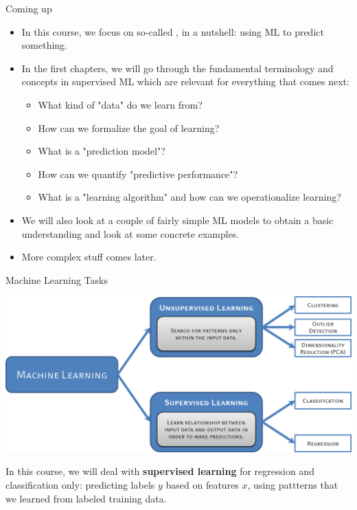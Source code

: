\documentclass[11pt,compress,t,notes=noshow, xcolor=table]{beamer}
\begin{document}
\begin{frame}{Coming up}

\begin{itemize}

  \item In this course, we focus on so-called , in a 
  nutshell: using ML to predict something.
  
  \item In the first chapters, we will go through the fundamental terminology 
  and concepts in supervised ML which are relevant for everything that comes 
  next:
  
  \begin{itemize}
  
    \item What kind of "data" do we learn from?
    \item How can we formalize the goal of learning?
    \item What is a "prediction model"?
    \item How can we quantify "predictive performance"?
    \item What is a "learning algorithm" and how can we operationalize learning?
  
  \end{itemize}
  
  \item We will also look at a couple of fairly simple ML models to obtain a
  basic understanding and look at some concrete examples.
  
  \item More complex stuff comes later.
  
\end{itemize}

\end{frame}


\begin{frame}{Machine Learning Tasks}

\begin{center}
  \includegraphics[height=0.5\textheight]{figure_man/ml-types.png}
\end{center}

In this course, we will deal with \textbf{supervised learning} for regression 
and classification only: predicting labels $y$ based on features $x$, using 
pattterns that we learned from labeled training data.

\end{frame}
\end{document}
